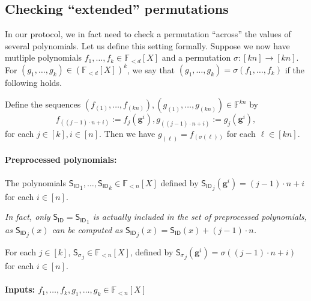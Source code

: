 \documentclass[11pt]{article} %
\newcommand{\F}{\ensuremath{\mathbb F}\xspace}
\newcommand{\sigof}[1]{\ensuremath{\sigma(#1)}\xspace}
\newcommand{\defeq}{:=}
\newcommand{\hgen}{\ensuremath{\mathbf{g}}\xspace}
\newcommand{\polysofdeg}[1]{\ensuremath{\F_{< #1}[X]}\xspace}
\newcommand{\sigpoly}{\ensuremath{\mathsf{S_{\sigma}}}\xspace}
\newcommand{\idpoly}{\ensuremath{\mathsf{S_{ID}}}\xspace}
\begin{document}
\subsection{Checking ``extended''  permutations}\label{subsec:extperm}
In our protocol, we in fact need to check a permutation ``across'' the values of several polynomials.
Let us define this setting formally.
Suppose we now have mutliple polynomials $f_1,\ldots,f_k\in \polysofdeg{d}$ and a permutation $\sigma:[kn]\to [kn]$.
For $(g_1,\ldots,g_k)\in \left(\polysofdeg{d}\right)^k$, we say that
$(g_1,\ldots,g_k)=\sigof{f_1,\ldots,f_k}$ if the following holds.

Define the sequences $(f_{(1)},\ldots, f_{(kn)}),(g_{(1)},\ldots,g_{(kn)}) \in \F^{kn}$
by 
\[f_{((j-1)\cdot n + i)} \defeq f_j(\hgen^i), g_{((j-1)\cdot n + i)} \defeq g_j(\hgen^i),\]
for each $j\in [k], i\in [n]$.
Then we have $g_{(\ell)} = f_{(\sigma(\ell))}$ for each $\ell \in [kn]$.





\paragraph{Preprocessed polynomials:}
The polynomials $\idpoly_1,\ldots,\idpoly_k \in \polysofdeg{n}$ defined by $\idpoly_j(\hgen^i) =(j-1)\cdot n + i$ for each $i\in [n]$.

\emph{In fact, only $\idpoly=\idpoly_1$ is actually included in the set of preprocessed polynomials, as $\idpoly_j(x)$ can be computed as $ \idpoly_j(x) = \idpoly(x) + (j-1)\cdot n$.}


For each $j\in [k]$, $\sigpoly_j \in \polysofdeg{n}$, defined by
$\sigpoly_j(\hgen^i) = \sigma((j-1)\cdot n + i)$ for each $i\in [n]$.

\paragraph{Inputs: $f_1,\ldots,f_k,g_1,\ldots,g_k \in \polysofdeg{n}$}
\end{document}
